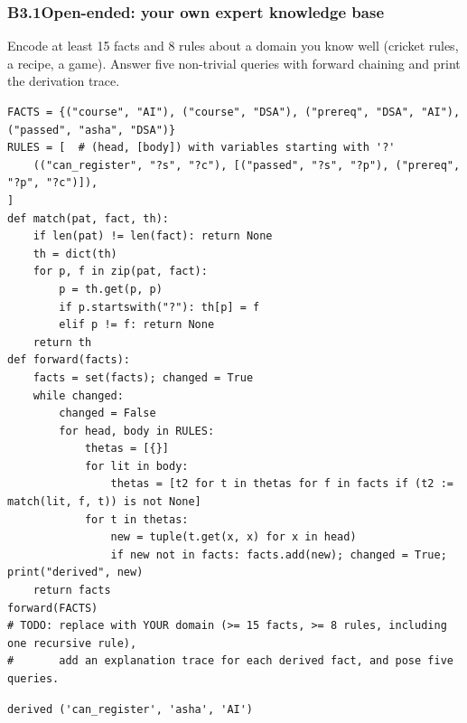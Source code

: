 \documentclass[11pt]{article}
\begin{document}
\subsubsection*{B3.1\quad Open-ended: your own expert knowledge base}
Encode at least 15 facts and 8 rules about a domain you know well (cricket rules, a recipe, a game). Answer five non-trivial queries with forward chaining and print the derivation trace.
\begin{lstlisting}[style=py]
FACTS = {("course", "AI"), ("course", "DSA"), ("prereq", "DSA", "AI"), ("passed", "asha", "DSA")}
RULES = [  # (head, [body]) with variables starting with '?'
    (("can_register", "?s", "?c"), [("passed", "?s", "?p"), ("prereq", "?p", "?c")]),
]
def match(pat, fact, th):
    if len(pat) != len(fact): return None
    th = dict(th)
    for p, f in zip(pat, fact):
        p = th.get(p, p)
        if p.startswith("?"): th[p] = f
        elif p != f: return None
    return th
def forward(facts):
    facts = set(facts); changed = True
    while changed:
        changed = False
        for head, body in RULES:
            thetas = [{}]
            for lit in body:
                thetas = [t2 for t in thetas for f in facts if (t2 := match(lit, f, t)) is not None]
            for t in thetas:
                new = tuple(t.get(x, x) for x in head)
                if new not in facts: facts.add(new); changed = True; print("derived", new)
    return facts
forward(FACTS)
# TODO: replace with YOUR domain (>= 15 facts, >= 8 rules, including one recursive rule),
#       add an explanation trace for each derived fact, and pose five queries.
\end{lstlisting}
\begin{lstlisting}[style=out]
derived ('can_register', 'asha', 'AI')
\end{lstlisting}
\end{document}
